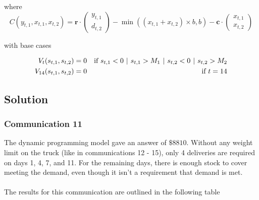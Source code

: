 \documentclass{article}
\newcommand{\bs}[1]{\boldsymbol{#1}} %
\begin{document}
where
$$C(y_{t,1}, x_{t,1}, x_{t,2}) = \bs{r}\cdot\begin{pmatrix}y_{t,1}\\d_{t,2}\end{pmatrix} - \min\left((x_{t,1} + x_{t,2}) \times b, b\right) - \bs{c}\cdot\begin{pmatrix}x_{t,1}\\x_{t,2}\end{pmatrix}$$


with base cases

\begin{align}
    V_t(s_{t,1},s_{t,2}) &= 0 & \text{if } s_{t,1} < 0 \hspace{0.125cm} | \hspace{0.125cm} s_{t,1} > M_1 \hspace{0.125cm} | \hspace{0.125cm} s_{t,2} < 0 \hspace{0.125cm} | \hspace{0.125cm} s_{t,2} > M_2 \\
    V_{14}(s_{t,1},s_{t,2}) &= 0 & \text{if } t = 14
\end{align}

\newpage

\subsection{Solution}
\bigskip
\subsubsection{Communication 11}

The dynamic programming model gave an answer of $\$8810$. Without any weight limit on the truck (like in communications 12 - 15), only 4 deliveries are required on days 1, 4, 7, and 11. For the remaining days, there is enough stock to cover meeting the demand, even though it isn't a requirement that demand is met. \\
\\
The results for this communication are outlined in the following table
\end{document}
